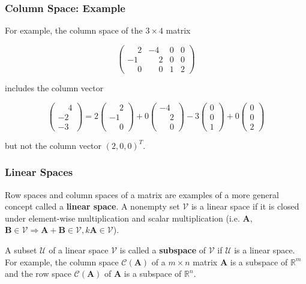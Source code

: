 \documentclass{beamer}
\begin{document}
\begin{frame}
\frametitle{Column Space: Example}
 For example, the column space of the $3 \times 4$ matrix

\[\begin{pmatrix}
\phantom{-}2 & -4 & 0 & 0\\
-1 & \phantom{-}2 & 0 & 0\\
\phantom{-}0 & \phantom{-}0 & 1 & 2
\end{pmatrix}\]

includes the column vector

\[
\begin{pmatrix}
\phantom{-}4\\
-2\\
-3
\end{pmatrix}
=
2\begin{pmatrix}
\phantom{-}2\\
-1\\
\phantom{-}0
\end{pmatrix}
+
0\begin{pmatrix}
-4\\
\phantom{-}2\\
\phantom{-}0
\end{pmatrix}
-
3\begin{pmatrix}
0\\
0\\
1
\end{pmatrix}
+
0\begin{pmatrix}
0\\
0\\
2
\end{pmatrix}
\]

but not the column vector $(2,0,0)^T$.  
\end{frame}

\begin{frame}
\frametitle{Linear Spaces}
Row spaces and column spaces of a matrix are examples of a more general concept called a \textbf{linear space}.  A nonempty set $\mathcal{V}$ is a linear space if it is closed under element-wise multiplication and scalar multiplication (i.e. $\mathbf{A}$, $\mathbf{B} \in \mathcal{V} \Rightarrow \mathbf{A} + \mathbf{B} \in \mathcal{V}, k\mathbf{A} \in \mathcal{V}$).
\vspace{0.5cm}

A subset $\mathcal{U}$ of a linear space $\mathcal{V}$ is called a \textbf{subspace} of $\mathcal{V}$ if $\mathcal{U}$ is a linear space.  For example, the column space $\mathcal{C}(\mathbf{A})$ of a $m \times n$ matrix $\mathbf{A}$ is a subspace of $\mathbb{R}^m$ and the row space $\mathcal{C}(\mathbf{A})$ of $\mathbf{A}$ is a subspace of $
\mathbb{R}^n$.
\end{frame}
\end{document}
